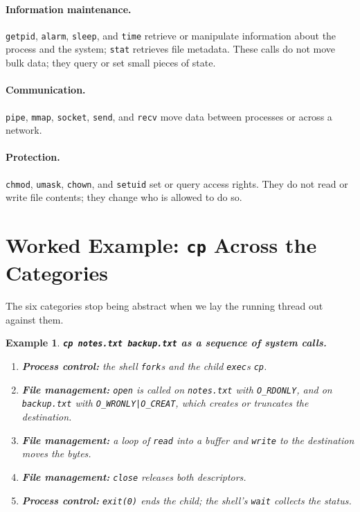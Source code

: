 \documentclass[11pt]{article}
\newtheorem{example}{Example}
\begin{document}
\paragraph{Information maintenance.} \texttt{getpid}, \texttt{alarm},
\texttt{sleep}, and \texttt{time} retrieve or manipulate information about the
process and the system; \texttt{stat} retrieves file metadata. These calls do
not move bulk data; they query or set small pieces of state.

\paragraph{Communication.} \texttt{pipe}, \texttt{mmap}, \texttt{socket},
\texttt{send}, and \texttt{recv} move data between processes or across a
network.

\paragraph{Protection.} \texttt{chmod}, \texttt{umask}, \texttt{chown}, and
\texttt{setuid} set or query access rights. They do not read or write file
contents; they change who is allowed to do so.

\section{Worked Example: \texttt{cp} Across the Categories}

The six categories stop being abstract when we lay the running thread out
against them.

\begin{example}
\textup{\textbf{\texttt{cp notes.txt backup.txt} as a sequence of system calls.}}
\begin{enumerate}
  \item \textbf{Process control:} the shell \texttt{fork}s and the child
        \texttt{exec}s \texttt{cp}.
  \item \textbf{File management:} \texttt{open} is called on
        \texttt{notes.txt} with \texttt{O\_RDONLY}, and on
        \texttt{backup.txt} with \texttt{O\_WRONLY|O\_CREAT}, which creates or
        truncates the destination.
  \item \textbf{File management:} a loop of \texttt{read} into a buffer and
        \texttt{write} to the destination moves the bytes.
  \item \textbf{File management:} \texttt{close} releases both descriptors.
  \item \textbf{Process control:} \texttt{exit(0)} ends the child; the shell's
        \texttt{wait} collects the status.
\end{enumerate}
\end{example}
\end{document}
